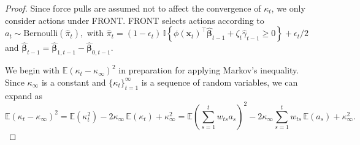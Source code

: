 \documentclass[12pt]{article}
\begin{document}
\begin{proof}
Since force pulls are assumed not to affect the convergence of $\kappa_t$, we only consider actions under FRONT. FRONT selects actions according to $a_t \sim \text{Bernoulli}(\widehat{\pi}_t),$ with
$\widehat{\pi}_t = (1-\epsilon_t)\,\mathbb{I}\!\left\{\phi(\bm{x}_t)^{\top}\widehat{\bm{\beta}}_{t-1} + \zeta_t\widehat{\gamma}_{t-1} \geq 0 \right\} + {\epsilon_t}/{2}$ and $\widehat{\bm{\beta}}_{t-1} = \widehat{\bm{\beta}}_{1,t-1} - \widehat{\bm{\beta}}_{0,t-1}$.

\medskip
\noindent
    We begin with $\mathbb{E}(\kappa_t-\kappa_\infty)^2$ in preparation for applying Markov's inequality. 
    Since $\kappa_\infty$ is a constant and $\{\kappa_t\}_{t=1}^\infty$ is a sequence of random variables, we can expand as
    \begin{equation}
    \label{equ1}
        \mathbb{E}(\kappa_t-\kappa_\infty)^2 = \mathbb{E}(\kappa_t^2) - 2\kappa_\infty \,\mathbb{E}(\kappa_t) + \kappa_\infty^2 = \mathbb{E}\left(\sum_{s=1}^{t}w_{ts}a_s\right)^2 - 2\kappa_\infty \sum_{s=1}^{t}w_{ts}\,\mathbb{E}(a_s) + \kappa_\infty^2.
    \end{equation}
    

\end{proof}
\end{document}
